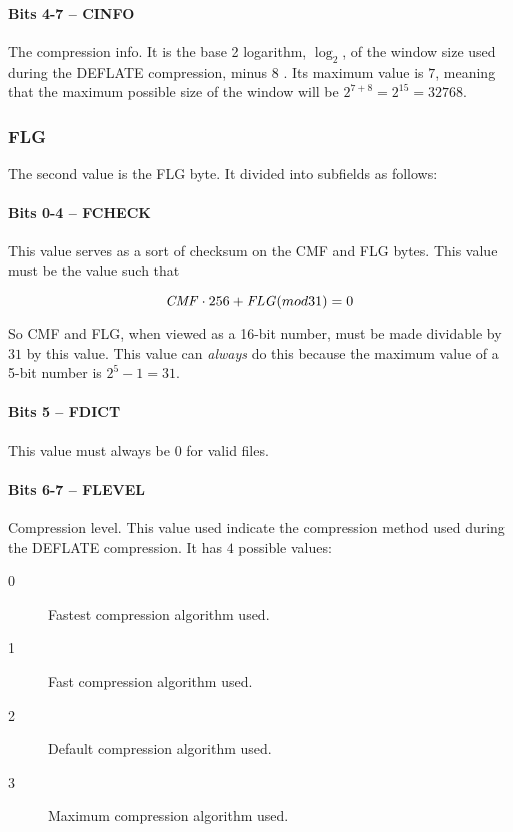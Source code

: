 \paragraph{Bits 4-7 -- CINFO}

The compression info. It is the base 2 logarithm, $\log_2$, of the
\lzone window size used during the DEFLATE compression, minus $8$ . Its
maximum value is $7$, meaning that the maximum possible size of the \lzone window
will be $2^{7 + 8} = 2^{15} = 32768$.

\subsubsection{FLG}

The second value is the FLG byte. It divided into subfields as
follows:

\paragraph{Bits 0-4 -- FCHECK}

This value serves as a sort of checksum on the CMF and FLG bytes. This
value must be the value such that

\begin{equation*}
  \mathit{CMF} \cdot 256 + \mathit{FLG} (mod 31) = 0
\end{equation*}

So CMF and FLG, when viewed as a 16-bit number, must be made dividable
by $31$ by this value. This value can \textit{always} do this because
the maximum value of a 5-bit number is $2^5 - 1 = 31$.

\paragraph{Bits 5 -- FDICT}

This value must always be $0$ for valid \png files.

\paragraph{Bits 6-7 -- FLEVEL}

Compression level. This value used indicate the compression method used
during the DEFLATE compression. It has $4$ possible values:

\begin{description}
\item[0] Fastest compression algorithm used.
\item[1] Fast compression algorithm used.
\item[2] Default compression algorithm used.
\item[3] Maximum compression algorithm used.
\end{description}

